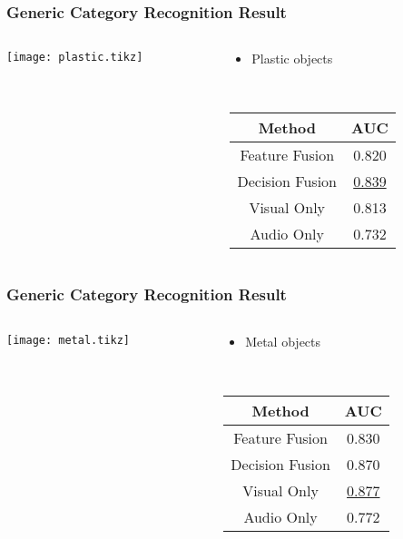 \documentclass{beamer}
\begin{document}
  \begin{frame}
    \frametitle{Generic Category Recognition Result}

    \begin{columns}
      \begin{column}{.6\textwidth}
        \centering
        \footnotesize
        \texttt{[image: plastic.tikz]}
      \end{column}
      \begin{column}{.4\textwidth}
        \begin{itemize}
          \item Plastic objects
        \end{itemize}
        ~

        \footnotesize
        \begin{tabular}[h]{c|c}
          \hline
          Method & AUC \\ \hline \hline
          Feature Fusion & 0.820 \\ \hline
          Decision Fusion & \underline{0.839} \\ \hline
          Visual Only & 0.813 \\ \hline
          Audio Only & 0.732 \\ \hline
        \end{tabular}
      \end{column}
    \end{columns}
  \end{frame}
  \begin{frame}
    \frametitle{Generic Category Recognition Result}

    \begin{columns}
      \begin{column}{.6\textwidth}
        \centering
        \footnotesize
        \texttt{[image: metal.tikz]}
      \end{column}
      \begin{column}{.4\textwidth}
        \begin{itemize}
          \item Metal objects
        \end{itemize}
        ~

        \footnotesize
        \begin{tabular}[h]{c|c}
          \hline
          Method & AUC \\ \hline \hline
          Feature Fusion & 0.830 \\ \hline
          Decision Fusion  & 0.870 \\ \hline
          Visual Only & \underline{0.877} \\ \hline
          Audio Only & 0.772 \\ \hline
        \end{tabular}
      \end{column}
    \end{columns}
  \end{frame}
\end{document}
